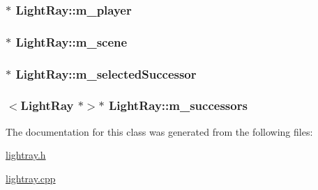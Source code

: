 \hypertarget{class_light_ray_a55cf457d13b240178933f0a73d6f7b2b}{
\subsubsection[{m\+\_\+player}]{$\ast$ Light\+Ray\+::m\+\_\+player\hspace{0.3cm}{\ttfamily [protected]}}}\label{class_light_ray_a55cf457d13b240178933f0a73d6f7b2b}
\hypertarget{class_light_ray_a9f99d6386ed92c979889f38b5348d628}{
\subsubsection[{m\+\_\+scene}]{$\ast$ Light\+Ray\+::m\+\_\+scene\hspace{0.3cm}{\ttfamily [protected]}}}\label{class_light_ray_a9f99d6386ed92c979889f38b5348d628}
\hypertarget{class_light_ray_a9e430528b861007696716fbd054c9de3}{
\subsubsection[{m\+\_\+selected\+Successor}]{$\ast$ Light\+Ray\+::m\+\_\+selected\+Successor\hspace{0.3cm}{\ttfamily [protected]}}}\label{class_light_ray_a9e430528b861007696716fbd054c9de3}
\hypertarget{class_light_ray_a669e04446c77fc44bee41146c1883356}{
\subsubsection[{m\+\_\+successors}]{$<${\bf Light\+Ray} $\ast$$>$$\ast$ Light\+Ray\+::m\+\_\+successors\hspace{0.3cm}{\ttfamily [protected]}}}\label{class_light_ray_a669e04446c77fc44bee41146c1883356}


The documentation for this class was generated from the following files\+:\begin{DoxyCompactItemize}
\item 
\hyperlink{lightray_8h}{lightray.\+h}\item 
\hyperlink{lightray_8cpp}{lightray.\+cpp}\end{DoxyCompactItemize}
